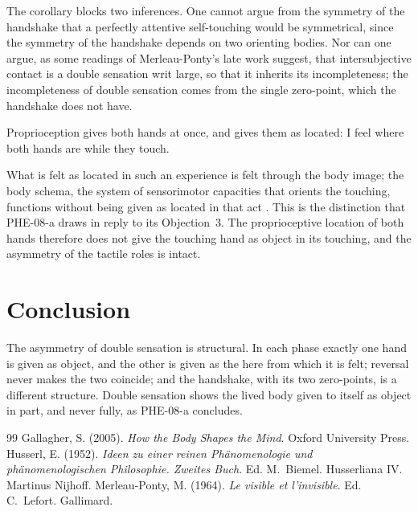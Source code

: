 \documentclass{situationist-preprint}
\begin{document}
The corollary blocks two inferences. One cannot argue from the symmetry of the handshake that a perfectly attentive self-touching would be symmetrical, since the symmetry of the handshake depends on two orienting bodies. Nor can one argue, as some readings of Merleau-Ponty's late work suggest, that intersubjective contact is a double sensation writ large, so that it inherits its incompleteness; the incompleteness of double sensation comes from the single zero-point, which the handshake does not have.

\begin{objection}
Proprioception gives both hands at once, and gives them as located: I feel where both hands are while they touch.
\end{objection}

\begin{reply}
What is felt as located in such an experience is felt through the body image; the body schema, the system of sensorimotor capacities that orients the touching, functions without being given as located in that act \citep{Gallagher2005}. This is the distinction that PHE-08-a draws in reply to its Objection~3. The proprioceptive location of both hands therefore does not give the touching hand as object in its touching, and the asymmetry of the tactile roles is intact.
\end{reply}

\section{Conclusion}

The asymmetry of double sensation is structural. In each phase exactly one hand is given as object, and the other is given as the here from which it is felt; reversal never makes the two coincide; and the handshake, with its two zero-points, is a different structure. Double sensation shows the lived body given to itself as object in part, and never fully, as PHE-08-a concludes.

\begin{thebibliography}{99}\small
{} Gallagher, S. (2005). \emph{How the Body Shapes the Mind}. Oxford University Press.
 Husserl, E. (1952). \emph{Ideen zu einer reinen Phänomenologie und phänomenologischen Philosophie. Zweites Buch}. Ed. M.~Biemel. Husserliana IV. Martinus Nijhoff.
 Merleau-Ponty, M. (1964). \emph{Le visible et l'invisible}. Ed. C.~Lefort. Gallimard.
\end{thebibliography}
\end{document}
